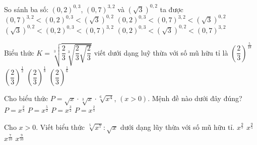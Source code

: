 \begin{ex}%
	So sánh ba số: $\left(0,2\right)^{0,3}$, $\left(0,7\right)^{3,2}$ và $\left(\sqrt 3\right) ^{0,2}$ ta được
	\choice
	{\True $\left(0,7\right)^{3,2}<\left(0,2\right)^{0,3}<\left(\sqrt 3\right)^{0,2}$}
	{$\left(0,2\right)^{0,3}<\left(0,7\right)^{3,2}<\left(\sqrt 3\right)^{0,2}$}
	{$\left(\sqrt 3\right) ^{0,2}<\left(0,2\right)^{0,3}<\left(0,7\right)^{3,2}$}
	{$\left(0,2\right)^{0,3}<\left(\sqrt 3\right)^{0,2}<\left(0,7\right)^{3,2}$}
\end{ex}

\begin{ex}%
	Biểu thức $K=\sqrt[3]{\dfrac{2}{3}\sqrt[3]{\dfrac{2}{3}\sqrt{\dfrac{2}{3}}}}$ viết dưới dạng luỹ thừa với số mũ hữu tỉ là
	\choice
	{$\left(\dfrac{2}{3}\right)^{\tfrac{5}{18}}$}
	{\True $\left(\dfrac{2}{3}\right)^{\tfrac{1}{2}}$}
	{$\left(\dfrac{2}{3}\right)^{\tfrac{1}{8}}$}
	{$\left(\dfrac{2}{3}\right)^{\tfrac{1}{6}}$}
\end{ex}

\begin{ex}%
	Cho biểu thức $P=\sqrt x \cdot \sqrt[3]{x}\cdot\sqrt[6]{x^4}$, $\left(x > 0\right)$. Mệnh đề nào dưới đây đúng?
	\choice
	{$P=x^{\tfrac{2}{3}}$}
	{$P=x^{\tfrac{5}{2}}$}
	{\True $P=x^{\tfrac{3}{2}}$}
	{$P=x^{\tfrac{2}{5}}$}
\end{ex}

\begin{ex}%
	Cho $x > 0$. Viết biểu thức $\sqrt[5]{x^7}:\sqrt x $ dưới dạng lũy thừa với số mũ hữu tỉ.
	\choice
	{$x^{\tfrac{9}{7}}$}
	{$x^{\tfrac{9}{5}}$}
	{$x^{\tfrac{7}{10}}$}
	{\True $x^{\tfrac{9}{10}}$}
\end{ex}

